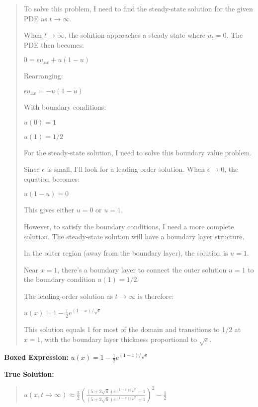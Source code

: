\documentclass{article}
\begin{document}
\begin{quote}
To solve this problem, I need to find the steady-state solution for the given PDE as $t \to \infty$.



When $t \to \infty$, the solution approaches a steady state where $u_t = 0$. The PDE then becomes:

$0 = \epsilon u_{xx} + u(1-u)$



Rearranging:

$\epsilon u_{xx} = -u(1-u)$



With boundary conditions:

$u(0) = 1$

$u(1) = 1/2$



For the steady-state solution, I need to solve this boundary value problem.



Since $\epsilon$ is small, I'll look for a leading-order solution. When $\epsilon \to 0$, the equation becomes:

$u(1-u) = 0$



This gives either $u = 0$ or $u = 1$.



However, to satisfy the boundary conditions, I need a more complete solution. The steady-state solution will have a boundary layer structure.



In the outer region (away from the boundary layer), the solution is $u = 1$.



Near $x = 1$, there's a boundary layer to connect the outer solution $u = 1$ to the boundary condition $u(1) = 1/2$.



The leading-order solution as $t \to \infty$ is therefore:



$\boxed{u(x) = 1 - \frac{1}{2}e^{(1-x)/\sqrt{\epsilon}}}$



This solution equals 1 for most of the domain and transitions to 1/2 at $x = 1$, with the boundary layer thickness proportional to $\sqrt{\epsilon}$.
\end{quote}
\textbf{Boxed Expression:} $u(x) = 1 - \frac{1}{2}e^{(1-x)/\sqrt{\epsilon}}$

\textbf{True Solution:}
\begin{quote}
$u(x,t \to \infty) \approx \frac{3}{2} \left(\frac{(5+2\sqrt{6}) e^{(1-x)/\sqrt{\epsilon}} - 1}{(5+2\sqrt{6}) e^{(1-x)/\sqrt{\epsilon}} + 1}\right)^2 - \frac{1}{2}$
\end{quote}
\end{document}
